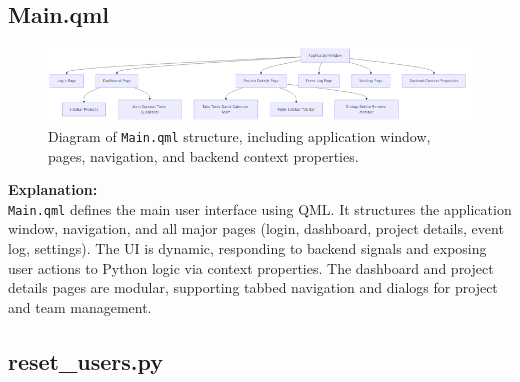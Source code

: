 \documentclass{report}
\begin{document}
\subsection{Main.qml}

\begin{figure}[h]
    \centering
    \includegraphics[width=\textwidth]{png_files/main_qml_architecture.png}
    \caption{Diagram of \texttt{Main.qml} structure, including application window, pages, navigation, and backend context properties.}
\end{figure}

\noindent
\textbf{Explanation:} \\
\texttt{Main.qml} defines the main user interface using QML. It structures the application window, navigation, and all major pages (login, dashboard, project details, event log, settings). The UI is dynamic, responding to backend signals and exposing user actions to Python logic via context properties. The dashboard and project details pages are modular, supporting tabbed navigation and dialogs for project and team management.

\subsection{reset\_users.py}
\end{document}
